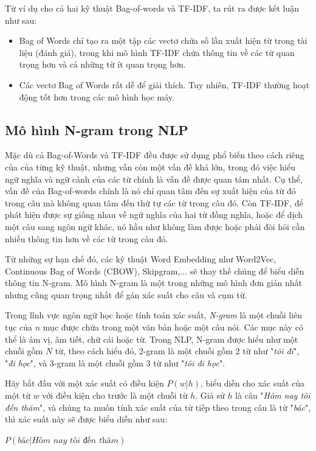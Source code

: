 Từ ví dụ cho cả hai kỹ thuật Bag-of-words và TF-IDF, ta rút ra được kết luận như sau:
\begin{itemize}
  \item Bag of Words chỉ tạo ra một tập các vectơ chứa số lần xuất hiện từ trong tài liệu (đánh giá), trong khi mô hình TF-IDF chứa thông tin về các từ quan trọng hơn và cả những từ ít quan trọng hơn.
  \item Các vectơ Bag of Words rất dễ để giải thích. Tuy nhiên, TF-IDF thường hoạt động tốt hơn trong các mô hình học máy.
\end{itemize}

\subsection{Mô hình N-gram trong NLP}
Mặc dù cả Bag-of-Words và TF-IDF đều được sử dụng phổ biến theo cách riêng của của từng kỹ thuật, nhưng vẫn còn một vấn đề khá lớn, trong đó việc hiểu ngữ nghĩa và ngữ cảnh của các từ chính là vấn đề được quan tâm nhất. Cụ thể, vấn đề của Bag-of-words chính là nó chỉ quan tâm đến sự xuất hiện của từ đó trong câu mà không quan tâm đến thứ tự các từ trong câu đó. Còn TF-IDF, để phát hiện được sự giống nhau về ngữ nghĩa của hai từ đồng nghĩa, hoặc để dịch một câu sang ngôn ngữ khác, nó hầu như không làm được hoặc phải đòi hỏi cần nhiều thông tin hơn về các từ trong câu đó.

Từ những sự hạn chế đó, các kỹ thuật Word Embedding như Word2Vec, Continuous Bag of Words (CBOW), Skipgram,... sẽ thay thế chúng để biểu diễn thông tin N-gram. Mô hình N-gram là một trong những mô hình đơn giản nhất nhưng cũng quan trọng nhất để gán xác suất cho câu và cụm từ.

Trong lĩnh vực ngôn ngữ học hoặc tính toán xác suất, \textit{N-gram} là một chuỗi liên tục của $n$ mục được chứa trong một văn bản hoặc một câu nói. Các mục này có thể là âm vị, âm tiết, chữ cái hoặc từ. Trong NLP, N-gram được hiểu như một chuỗi gồm $N$ từ, theo cách hiểu đó, 2-gram là một chuỗi gồm 2 từ như "\textit{tôi đi}", "\textit{đi học}", và 3-gram là một chuỗi gồm 3 từ như "\textit{tôi đi học}".

Hãy bắt đầu với một xác suất có điều kiện $P(w|h)$, biểu diễn cho xác suất của một từ $w$ với điều kiện cho trước là một chuỗi từ $h$. Giả sử $h$ là câu "\textit{Hôm nay tôi đến thăm}", và chúng ta muốn tính xác suất của từ tiếp theo trong câu là từ "\textit{bác}", thì xác suất này sẽ được biểu diễn như sau:
\begin{center}
    $P(\textit{bác} | \textit{Hôm nay tôi đến thăm})$
\end{center}

